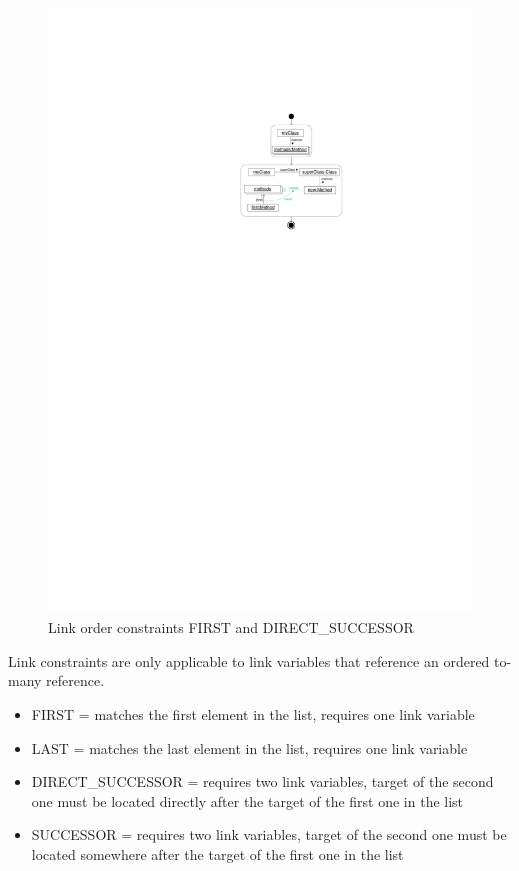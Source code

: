 

\begin{figure}[p]
  \centering
  \includegraphics[scale=.8]{figures/LinkConstraints1}
  \caption{Link order constraints FIRST and DIRECT\_SUCCESSOR}
  \label{fig:linkConstraints}
\end{figure}

Link constraints are only applicable to link variables that reference an ordered to-many reference.

\begin{itemize}
  \item FIRST = matches the first element in the list, requires one link variable
  \item LAST = matches the last element in the list, requires one link variable
  \item DIRECT\_SUCCESSOR = requires two link variables, target of the second one must be located directly after the target of the first one in the list
  \item SUCCESSOR = requires two link variables, target of the second one must be located somewhere after the target of the first one in the list
\end{itemize}


